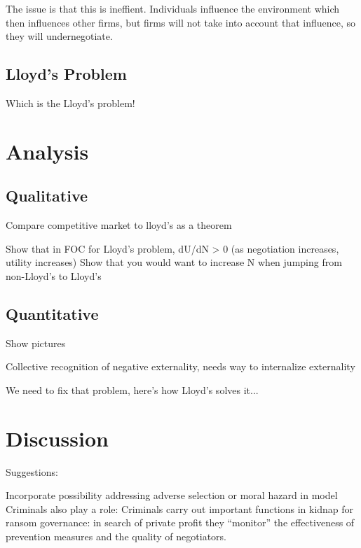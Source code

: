 \documentclass[12pt]{article}
\begin{document}
The issue is that this is ineffient. Individuals influence the environment which then influences other firms, but firms will not take into account that influence, so they will undernegotiate.

\subsection{Lloyd's Problem}

Which is the Lloyd's problem! 

\section{Analysis}

\subsection{Qualitative}

Compare competitive market to lloyd's as a theorem

Show that in FOC for Lloyd's problem, dU/dN > 0 (as negotiation increases, utility increases)
Show that you would want to increase N when jumping from non-Lloyd's to Lloyd's

\subsection{Quantitative}

Show pictures

Collective recognition of negative externality, needs way to internalize externality

We need to fix that problem, here's how Lloyd's solves it...

\section{Discussion}

Suggestions:

Incorporate possibility addressing adverse selection or moral hazard in model
Criminals also play a role:
Criminals carry out important functions in kidnap for ransom governance: in search of private profit they “monitor” the effectiveness of prevention measures and the quality of negotiators.
\end{document}

